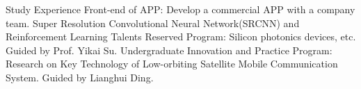 

\begin{rubric}{Study Experience}
 		Front-end of APP: Develop a commercial APP with a company team.
        Super Resolution Convolutional Neural Network(SRCNN) and Reinforcement Learning
        Talents Reserved Program: Silicon photonics devices, etc. Guided by Prof. Yikai Su.
        Undergraduate Innovation and Practice Program: Research on Key Technology of Low-orbiting Satellite Mobile Communication System. Guided by Lianghui Ding.
\end{rubric}

